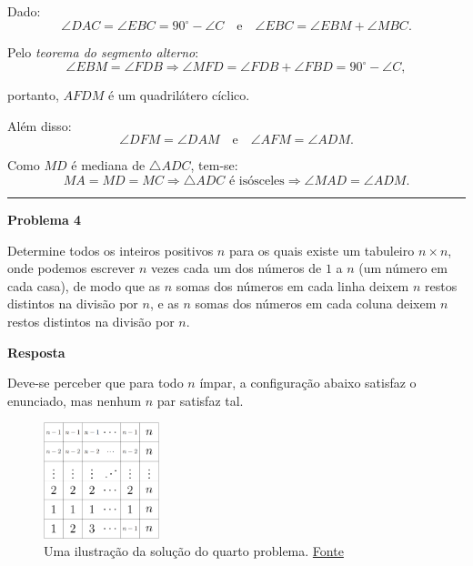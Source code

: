 \documentclass{article}
\begin{document}
  Dado:
  \[
    \angle DAC = \angle EBC = 90^\circ - \angle C \quad \text{e} \quad \angle EBC = \angle EBM + \angle MBC.
  \]

  Pelo \textit{teorema do segmento alterno}:
  \[
    \angle EBM = \angle FDB \Rightarrow \angle MFD = \angle FDB + \angle FBD = 90^\circ - \angle C,
  \]
  
  portanto, \( AFDM \) é um quadrilátero cíclico.

  Além disso:
  \[
    \angle DFM = \angle DAM \quad \text{e} \quad \angle AFM = \angle ADM.
  \]

  Como \( MD \) é mediana de \( \triangle ADC \), tem-se:
  \[
    MA = MD = MC \Rightarrow \triangle ADC \text{ é isósceles} \Rightarrow \angle MAD = \angle ADM.
  \]

  \noindent\rule{\linewidth}{0.4pt}

  {\centering \textbf{Problema 4} \par}
  Determine todos os inteiros positivos \( n \) para os quais existe um tabuleiro \( n \times n \), onde podemos escrever \( n \) vezes cada um dos números de
  \( 1 \) a \( n \) (um número em cada casa), de modo que as \( n \) somas dos números em cada linha deixem \( n \) restos distintos na divisão por \( n \), e as \( n \) somas dos
  números em cada coluna deixem \( n \) restos distintos na divisão por \( n \).

  \medskip

  {\centering \textbf{Resposta} \par }

  Deve-se perceber que para todo $n$ ímpar, a configuração abaixo satisfaz o enunciado,
  mas nenhum $n$ par satisfaz tal.

  \begin{figure}[h]
    \centering
    \includegraphics[width=0.3\textwidth]{second.png}
    \caption{Uma ilustração da solução do quarto problema. \href{https://noic.com.br/wp-content/uploads/2025/03/Solucoes_do_TM2_2024_Nivel_A.pdf}{Fonte}}
  \end{figure}
  
\end{document}
